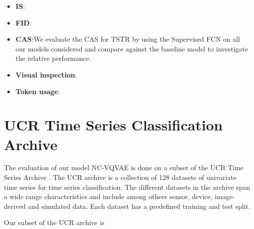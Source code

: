 \documentclass[../../thesis.tex]{subfiles}
\begin{document}
\begin{itemize}
    \item \textbf{IS}:
    \item \textbf{FID}:
    \item \textbf{CAS}:We evaluate the CAS for TSTR by using the Supervised FCN on all our models considered and compare against the baseline model to investigate the relative performance. 
    \item \textbf{Visual inspection}:
    \item \textbf{Token usage}:
\end{itemize}


\section{UCR Time Series Classification Archive}
The evaluation of our model NC-VQVAE is done on a subset of the UCR Time Series Archive \cite{UCRArchive2018}. The UCR archive is a collection of 128 datasets of univariate time series for time series classification. The different datasets in the archive span a wide range characteristics and include among others sensor, device, image-derived and simulated data. Each dataset has a predefined training and test split.\newline

Our subset of the UCR archive is
\end{document}
